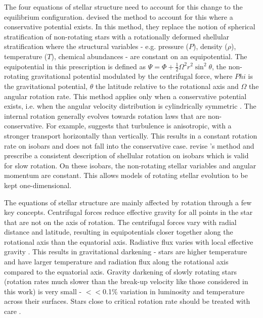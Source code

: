 The four equations of stellar structure need to account for this change to the equilibrium configuration.
\citet{kippenhahn_simple_1970} devised the method to account for this where a conservative potential exists.
In this method, they replace the notion of spherical stratification of non-rotating stars with a rotationally deformed shellular stratification where the structural variables - e.g. pressure ($P$), density ($\rho$), temperature ($T$), chemical abundances - are constant on an equipotential.
The equipotential in this prescription is defined as 
$\Psi = \Phi + \frac{1}{2}\Omega^2 r^2 \sin^2 \theta$, the non-rotating gravitational potential modulated by the centrifugal force, where $Phi$ is the gravitational potential, $\theta$ the latitude relative to the rotational axis and $\Omega$ the angular rotation rate.
This method applies only when a conservative potential exists, i.e. when the angular velocity distribution is cylindrically symmetric \citep{tassoul_theory_1978}.
The internal rotation generally evolves towards rotation laws that are non-conservative.
For example, \citet{zahn_circulation_1992} suggests that turbulence is anisotropic, with a stronger transport horizontally than vertically. 
This results in a constant rotation rate on isobars and does not fall into the conservative case.
\citet{maeder_diffusive_1996} revise \citet{kippenhahn_circulation_1974}'s method and prescribe a consistent description of shellular rotation on isobars which is valid for slow rotation.
On these isobars, the non-rotating stellar variables and angular momentum are constant. 
This allows models of rotating stellar evolution to be kept one-dimensional.

The equations of stellar structure are mainly affected by rotation through a few key concepts.
Centrifugal forces reduce effective gravity for all points in the star that are not on the axis of rotation.
The centrifugal forces vary with radial distance and latitude, resulting in equipotentials closer together along the rotational axis than the equatorial axis.
Radiative flux varies with local effective gravity \citep{von_zeipel_radiative_1924}.
This results in gravitational darkening \citep{von_zeipel_radiative_1924, kippenhahn_rotational_1977} - stars are higher temperature and have larger temperature and radiation flux along the rotational axis compared to the equatorial axis.
Gravity darkening of slowly rotating stars (rotation rates much slower than the break-up velocity like those considered in this work) is very small - $<<$0.1\% variation in luminosity and temperature across their surfaces.
Stars close to critical rotation rate should be treated with care \citep{kippenhahn_rotational_1977,maeder_stellar_1999,heger_presupernova_2000}.

